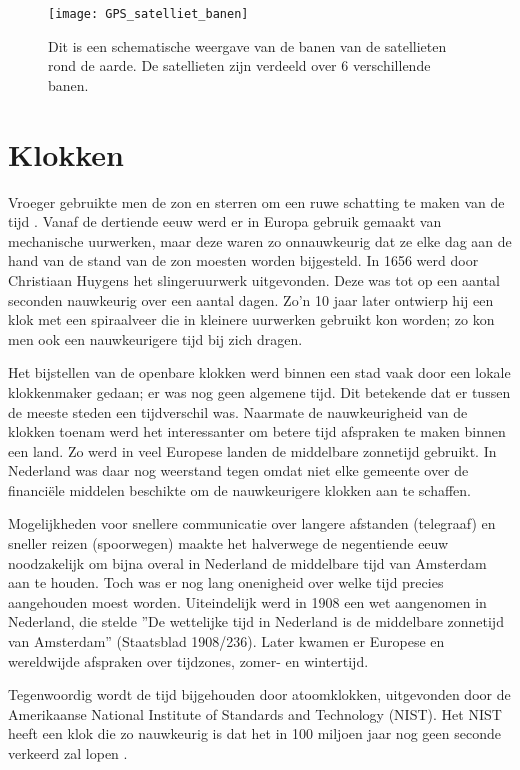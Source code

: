 \begin{figure}
    \centering
    \texttt{[image: GPS\_satelliet\_banen]}
    \caption{Dit is een schematische weergave van de banen van de \gps
    satellieten rond de aarde. De satellieten zijn verdeeld over 6
    verschillende banen.}
    \label{fig:GPS_satelliet_banen}
\end{figure}


\section{Klokken}

Vroeger gebruikte men de zon en sterren om een ruwe schatting te maken
van de tijd \cite{gent2003wet}. Vanaf de dertiende eeuw werd er in
Europa gebruik gemaakt van mechanische uurwerken, maar deze waren zo
onnauwkeurig dat ze elke dag aan de hand van de stand van de zon moesten worden
bijgesteld. In 1656 werd door Christiaan Huygens het slingeruurwerk
uitgevonden. Deze was tot op een aantal seconden nauwkeurig over een
aantal dagen. Zo'n 10 jaar later ontwierp hij een klok met een
spiraalveer die in kleinere uurwerken gebruikt kon worden; zo kon men
ook een nauwkeurigere tijd bij zich dragen.

Het bijstellen van de openbare klokken werd binnen een stad vaak door
een lokale klokkenmaker gedaan; er was nog geen algemene tijd. Dit
betekende dat er tussen de meeste steden een tijdverschil was. Naarmate
de nauwkeurigheid van de klokken toenam werd het interessanter om betere tijd
afspraken te maken binnen een land. Zo werd in veel Europese landen de
middelbare zonnetijd gebruikt. In Nederland was daar nog weerstand tegen
omdat niet elke gemeente over de financiële middelen beschikte om de
nauwkeurigere klokken aan te schaffen.

Mogelijkheden voor snellere communicatie over langere afstanden
(telegraaf) en sneller reizen (spoorwegen) maakte het halverwege de
negentiende eeuw noodzakelijk om bijna overal in Nederland de middelbare
tijd van Amsterdam aan te houden. Toch was er nog lang onenigheid over
welke tijd precies aangehouden moest worden. Uiteindelijk werd in 1908
een wet aangenomen in Nederland, die stelde ''De wettelijke tijd in
Nederland is de middelbare zonnetijd van Amsterdam'' (Staatsblad
1908/236). Later kwamen er Europese en wereldwijde afspraken over
tijdzones, zomer- en wintertijd.

Tegenwoordig wordt de tijd bijgehouden door atoomklokken, uitgevonden door
de Amerikaanse National Institute of Standards and Technology (NIST).
Het NIST heeft een klok die zo nauwkeurig is dat het in 100 miljoen jaar
nog geen seconde verkeerd zal lopen \cite{nist2013ces}.

